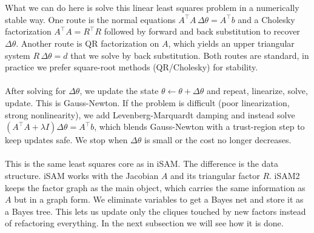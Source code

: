 \\ \\
What we can do here is solve this linear least squares problem in a numerically stable way. One route is the normal equations $A^\top A\,\Delta\theta = A^\top b$ and a Cholesky factorization $A^\top A = R^\top R$ followed by forward and back substitution to recover $\Delta\theta$. Another route is QR factorization on $A$, which yields an upper triangular system $R\,\Delta\theta = d$ that we solve by back substitution. Both routes are standard, in practice we prefer square-root methods (QR/Cholesky) for stability.
\\ \\
After solving for $\Delta\theta$, we update the state $\theta \leftarrow \theta + \Delta\theta$ and repeat, linearize, solve, update. This is Gauss-Newton. If the problem is difficult (poor linearization, strong nonlinearity), we add Levenberg-Marquardt damping and instead solve $(A^\top A + \lambda I)\Delta\theta = A^\top b$, which blends Gauss-Newton with a trust-region step to keep updates safe. We stop when $\Delta\theta$ is small or the cost no longer decreases.
\\ \\
This is the same least squares core as in iSAM. The difference is the data structure. iSAM works with the Jacobian $A$ and its triangular factor $R$. iSAM2 keeps the factor graph as the main object, which carries the same information as $A$ but in a graph form. We eliminate variables to get a Bayes net and store it as a Bayes tree. This lets us update only the cliques touched by new factors instead of refactoring everything. In the next subsection we will see how it is done.



